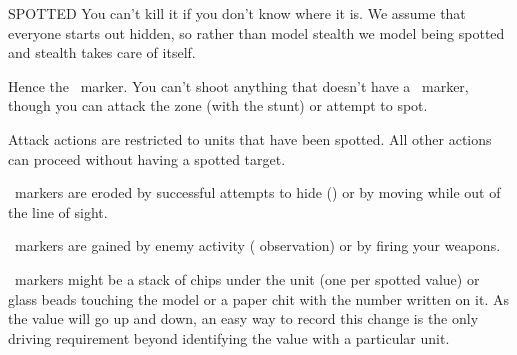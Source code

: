 \begin{sidebox}{SPOTTED}
You can't kill it if you don't know where it is. We assume that everyone starts out hidden, so rather than model stealth we model being spotted and stealth takes care of itself.

Hence the \SPOTTED\ marker. You can't shoot anything that doesn't have a \SPOTTED\ marker, though you can attack the zone (with the  stunt) or attempt to spot.

Attack actions are restricted to units that have been spotted. All other actions can proceed without having a spotted target.

\SPOTTED\ markers are eroded by successful attempts to hide () or by moving while out of the line of sight.

\SPOTTED\ markers are gained by enemy activity ( observation) or by firing your weapons.

\SPOTTED\ markers might be a stack of chips under the unit (one per spotted value) or glass beads touching the model or a paper chit with the number written on it. As the value will go up and down, an easy way to record this change is the only driving requirement beyond identifying the value with a particular unit.
\end{sidebox}
